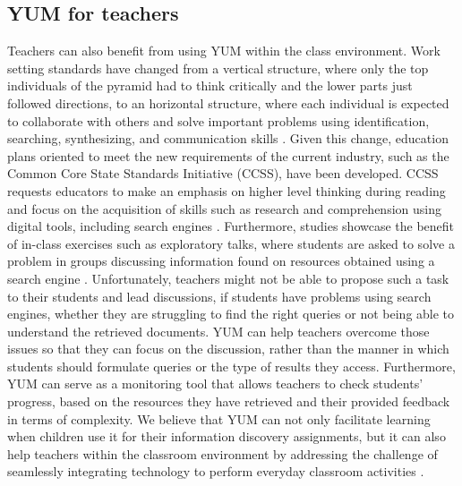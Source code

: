 \documentclass{sig-alternate-05-2015}
\begin{document}
\subsection{YUM for teachers}
\label{sec:teachers}
Teachers can also benefit from using YUM within the class environment. Work setting standards have changed from a vertical structure, where only the top individuals of the pyramid had to think critically and the lower parts just followed directions, 
to an horizontal structure, where each individual is expected to collaborate with others and solve important problems using identification, searching, synthesizing, and communication skills \cite{leu13}. Given this change, education plans oriented to meet the new requirements of the current industry, such as the Common Core State Standards Initiative (CCSS), have been developed. CCSS requests educators to make an emphasis on higher level thinking during reading and focus on the acquisition of skills such as research and comprehension using digital tools, including search engines \cite{leu13}. Furthermore, studies  showcase the benefit of in-class exercises such as  exploratory talks, where students are asked to solve a problem in groups discussing information found on resources obtained using a search engine \cite{kni15}. Unfortunately, teachers might not be able to propose such a task to their students and lead discussions, if students have problems using search engines, whether they are struggling to  find the right queries or not being able to  understand the retrieved documents. YUM can help teachers overcome those issues so that they can focus on the discussion, rather than the manner in which students should formulate queries or the type of results they access. Furthermore, YUM can serve as a monitoring tool that allows teachers to check students' progress, based on the resources they have retrieved and their provided feedback in terms of complexity. We believe that  YUM can  not only facilitate learning when children use it for their information discovery assignments, but it can also help teachers within the classroom environment by  addressing the challenge of seamlessly integrating technology to perform everyday classroom activities \cite{Dan13,kni15}.
\end{document}
